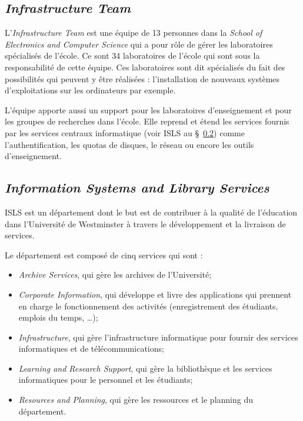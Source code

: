 \subsection{\textit{Infrastructure Team}}

L'\textit{Infrastructure Team} est une \'equipe de 13 personnes dans la \textit{School of Electronics and Computer Science} qui a pour r\^ole de g\'erer les laboratoires sp\'ecialis\'es de l'\'ecole.
Ce sont 34 laboratoires de l'\'ecole qui sont sous la responsabilit\'e de cette \'equipe.
Ces laboratoires sont dit sp\'ecialis\'es du fait des possibilit\'es qui peuvent y \^etre r\'ealis\'ees : l'installation de nouveaux syst\`emes d'exploitations sur les ordinateurs par exemple.

L'\'equipe apporte aussi un support pour les laboratoires d'enseignement et pour les groupes de recherches dans l'\'ecole.
Elle reprend et \'etend les services fournis par les services centraux informatique (voir ISLS au \S~\ref{section:ISLS}) comme l'authentification, les quotas de disques, le r\'eseau ou encore les outils d'enseignement.

\subsection{\textit{Information Systems and Library Services}}
\label{section:ISLS}

ISLS est un d\'epartement dont le but est de contribuer \`a la qualit\'e de l'\'education dans l'Universit\'e de Westminster \`a travers le d\'eveloppement et la livraison de services.

\noindent Le d\'epartement est compos\'e de cinq services qui sont :

\begin{itemize}
	\item \textit{Archive Services}, qui g\`ere les archives de l'Universit\'e;
	\item \textit{Corporate Information}, qui d\'eveloppe et livre des applications qui prennent en charge le fonctionnement des activit\'es (enregistrement des \'etudiants, emplois du temps, \ldots);
	\item \textit{Infrastructure}, qui g\`ere l'infrastructure informatique pour fournir des services informatiques et de t\'el\'ecommunications;
	\item \textit{Learning and Research Support}, qui g\`ere la biblioth\`eque et les services informatiques pour le personnel et les \'etudiants;
	\item \textit{Resources and Planning}, qui g\`ere les ressources et le planning du d\'epartement.

\end{itemize}

